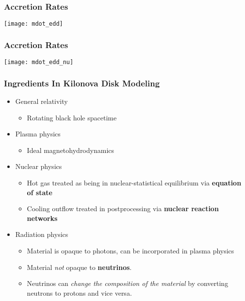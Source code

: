 \documentclass[]{beamer}
\newcommand{\backupbegin}{
   \newcounter{finalframe}
   \setcounter{finalframe}{\value{framenumber}}
}
\begin{document}
\backupbegin

\begin{frame}
  \frametitle{Accretion Rates}
  \begin{center}
    \texttt{[image: mdot\_edd]}
  \end{center}
\end{frame}

\begin{frame}
  \frametitle{Accretion Rates}
  \begin{center}
    \texttt{[image: mdot\_edd\_nu]}
  \end{center}
\end{frame}

\begin{frame}
  \frametitle{Ingredients In Kilonova Disk Modeling}
  \begin{itemize}
  \item General relativity
    \begin{itemize}
    \item Rotating black hole spacetime
    \end{itemize}
  \item Plasma physics
    \begin{itemize}
    \item Ideal magnetohydrodynamics
    \end{itemize}
  \item Nuclear physics
    \begin{itemize}
    \item Hot gas treated as being in nuclear-statistical equilibrium via \textbf{equation of state}
    \item Cooling outflow treated in postprocessing via \textbf{nuclear reaction networks}
    \end{itemize}
  \item Radiation physics
    \begin{itemize}
    \item Material is opaque to photons, can be incorporated in plasma physics
    \item Material \textit{not} opaque to \textbf{neutrinos}.
    \item Neutrinos can \textit{change the composition of the
        material} by converting neutrons to protons and vice versa.
    \end{itemize}
  \end{itemize}
\end{frame}
\end{document}
